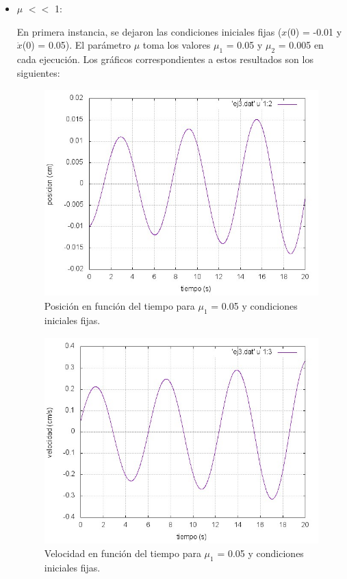 \documentclass[a4paper,12pt]{article}
\begin{document}
\begin{itemize}
\item $\mu$ $<<$ 1:


En primera instancia, se dejaron las condiciones iniciales fijas ($x$(0) = -0.01 y $\dot{x}$(0) = 0.05). El par\'ametro $\mu$ toma los valores $\mu_1$ = 0.05 y $\mu_2$ = 0.005 en cada ejecuci\'on. Los gr\'aficos correspondientes a estos resultados son los siguientes:

\begin{figure}[H]
\begin{center}
\includegraphics[height=8cm]{grafico_ej3_xVSt.jpg}
\caption[width=5cm]{Posici\'on en funci\'on del tiempo para $\mu_1$ = 0.05 y condiciones iniciales fijas.}
\end{center}
\end{figure}

\begin{figure}[H]
\begin{center}
\includegraphics[height=8cm]{grafico_ej3_vVSt.jpg}
\caption[width=5cm]{Velocidad en funci\'on del tiempo para $\mu_1$ = 0.05 y condiciones iniciales fijas.}
\end{center}
\end{figure}


\end{itemize}
\end{document}
